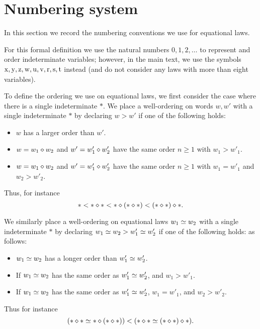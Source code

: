 \section{Numbering system}\label{numbering-app}

In this section we record the numbering conventions we use for equational laws.

For this formal definition we use the natural numbers $0,1,2,\dots$ to represent and order indeterminate variables; however, in the main text, we use the symbols $\mathrm{x},\mathrm{y},\mathrm{z},\mathrm{w},\mathrm{u},\mathrm{v},\mathrm{r},\mathrm{s},\mathrm{t}$ instead (and do not consider any laws with more than eight variables).

To define the ordering we use on equational laws, we first consider the case where there is a single indeterminate $\ast$.
We place a well-ordering on words $w,w'$ with a single indeterminate $\ast$ by declaring $w > w'$ if one of the following holds:
\begin{itemize}
    \item $w$ has a larger order than $w'$.
    \item $w = w_1 \diamond w_2$ and $w' = w'_1 \diamond w'_2$ have the same order $n \geq 1$ with $w_1 > w'_1$.
    \item $w = w_1 \diamond w_2$ and $w' = w'_1 \diamond w'_2$ have the same order $n \geq 1$ with $w_1 = w'_1$ and $w_2 > w'_2$.
\end{itemize}
Thus, for instance
$$ \ast < \ast \diamond \ast < \ast \diamond (\ast \diamond \ast) < (\ast \diamond \ast) \diamond \ast.$$

We similarly place a well-ordering on equational laws $w_1 \simeq w_2$ with a single indeterminate $\ast$ by declaring $w_1 \simeq w_2 > w'_1 \simeq w'_2$ if one of the following holds:
as follows:
\begin{itemize}
\item  $w_1 \simeq w_2$ has a longer order than $w'_1 \simeq w'_2$.
\item If $w_1 \simeq w_2$ has the same order as $w'_1 \simeq w'_2$, and $w_1 > w'_1$.
\item If $w_1 \simeq w_2$ has the same order as $w'_1 \simeq w'_2$, $w_1 = w'_1$, and $w_2 > w'_2$.
\end{itemize}
Thus for instance
$$ (\ast \diamond \ast \simeq \ast \diamond (\ast \diamond \ast)) < (\ast \diamond \ast \simeq (\ast \diamond \ast) \diamond \ast).$$

